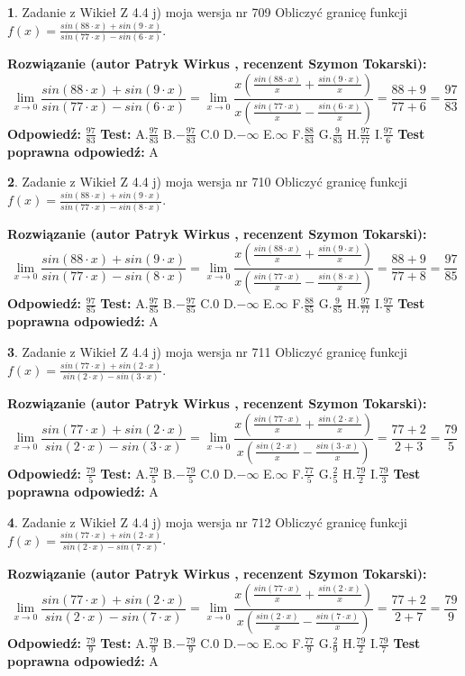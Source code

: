 \documentclass[12pt, a4paper]{article}
\theoremstyle{definition} %
\newtheorem{zad}{}
\newcommand{\zadStart}[1]{\begin{zad}#1\newline}
\newcommand{\zadStop}{\end{zad}}
\newcommand{\rozwStart}[2]{\noindent \textbf{Rozwiązanie (autor #1 , recenzent #2): }\newline}
\newcommand{\rozwStop}{\newline}
\newcommand{\odpStart}{\noindent \textbf{Odpowiedź:}\newline}
\newcommand{\odpStop}{\newline}
\newcommand{\testStart}{\noindent \textbf{Test:}\newline}
\newcommand{\testStop}{\newline}
\newcommand{\kluczStart}{\noindent \textbf{Test poprawna odpowiedź:}\newline}
\newcommand{\kluczStop}{\newline}
\begin{document}
\zadStart{Zadanie z Wikieł Z 4.4 j) moja wersja nr 709}
Obliczyć granicę funkcji $f(x)=\frac{sin(88\cdot x) +sin(9\cdot x)}{sin(77\cdot x) -sin(6\cdot x)}$.
\zadStop
\rozwStart{Patryk Wirkus}{Szymon Tokarski}
$$\lim\limits_{x\to 0}\frac{sin(88\cdot x) +sin(9\cdot x)}{sin(77\cdot x) -sin(6\cdot x)}=\lim\limits_{x\to 0}\frac{x(\frac{sin(88\cdot x)}{x}+\frac{sin(9\cdot x)}{x})}{x(\frac{sin(77\cdot x)}{x}-\frac{sin(6\cdot x)}{x})}=\frac{88+9}{77+6} = \frac{97}{83}$$
\rozwStop
\odpStart
$\frac{97}{83}$
\odpStop
\testStart
A.$\frac{97}{83}$
B.$-\frac{97}{83}$
C.$0$
D.$-\infty$
E.$\infty$
F.$\frac{88}{83}$
G.$\frac{9}{83}$
H.$\frac{97}{77}$
I.$\frac{97}{6}$
\testStop
\kluczStart
A
\kluczStop



\zadStart{Zadanie z Wikieł Z 4.4 j) moja wersja nr 710}
Obliczyć granicę funkcji $f(x)=\frac{sin(88\cdot x) +sin(9\cdot x)}{sin(77\cdot x) -sin(8\cdot x)}$.
\zadStop
\rozwStart{Patryk Wirkus}{Szymon Tokarski}
$$\lim\limits_{x\to 0}\frac{sin(88\cdot x) +sin(9\cdot x)}{sin(77\cdot x) -sin(8\cdot x)}=\lim\limits_{x\to 0}\frac{x(\frac{sin(88\cdot x)}{x}+\frac{sin(9\cdot x)}{x})}{x(\frac{sin(77\cdot x)}{x}-\frac{sin(8\cdot x)}{x})}=\frac{88+9}{77+8} = \frac{97}{85}$$
\rozwStop
\odpStart
$\frac{97}{85}$
\odpStop
\testStart
A.$\frac{97}{85}$
B.$-\frac{97}{85}$
C.$0$
D.$-\infty$
E.$\infty$
F.$\frac{88}{85}$
G.$\frac{9}{85}$
H.$\frac{97}{77}$
I.$\frac{97}{8}$
\testStop
\kluczStart
A
\kluczStop



\zadStart{Zadanie z Wikieł Z 4.4 j) moja wersja nr 711}
Obliczyć granicę funkcji $f(x)=\frac{sin(77\cdot x) +sin(2\cdot x)}{sin(2\cdot x) -sin(3\cdot x)}$.
\zadStop
\rozwStart{Patryk Wirkus}{Szymon Tokarski}
$$\lim\limits_{x\to 0}\frac{sin(77\cdot x) +sin(2\cdot x)}{sin(2\cdot x) -sin(3\cdot x)}=\lim\limits_{x\to 0}\frac{x(\frac{sin(77\cdot x)}{x}+\frac{sin(2\cdot x)}{x})}{x(\frac{sin(2\cdot x)}{x}-\frac{sin(3\cdot x)}{x})}=\frac{77+2}{2+3} = \frac{79}{5}$$
\rozwStop
\odpStart
$\frac{79}{5}$
\odpStop
\testStart
A.$\frac{79}{5}$
B.$-\frac{79}{5}$
C.$0$
D.$-\infty$
E.$\infty$
F.$\frac{77}{5}$
G.$\frac{2}{5}$
H.$\frac{79}{2}$
I.$\frac{79}{3}$
\testStop
\kluczStart
A
\kluczStop



\zadStart{Zadanie z Wikieł Z 4.4 j) moja wersja nr 712}
Obliczyć granicę funkcji $f(x)=\frac{sin(77\cdot x) +sin(2\cdot x)}{sin(2\cdot x) -sin(7\cdot x)}$.
\zadStop
\rozwStart{Patryk Wirkus}{Szymon Tokarski}
$$\lim\limits_{x\to 0}\frac{sin(77\cdot x) +sin(2\cdot x)}{sin(2\cdot x) -sin(7\cdot x)}=\lim\limits_{x\to 0}\frac{x(\frac{sin(77\cdot x)}{x}+\frac{sin(2\cdot x)}{x})}{x(\frac{sin(2\cdot x)}{x}-\frac{sin(7\cdot x)}{x})}=\frac{77+2}{2+7} = \frac{79}{9}$$
\rozwStop
\odpStart
$\frac{79}{9}$
\odpStop
\testStart
A.$\frac{79}{9}$
B.$-\frac{79}{9}$
C.$0$
D.$-\infty$
E.$\infty$
F.$\frac{77}{9}$
G.$\frac{2}{9}$
H.$\frac{79}{2}$
I.$\frac{79}{7}$
\testStop
\kluczStart
A
\kluczStop
\end{document}
